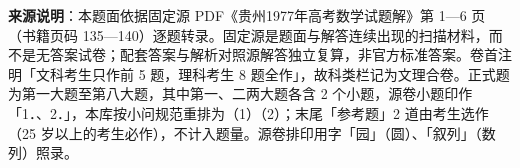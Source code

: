 


\begin{gktip}
\textbf{来源说明}：本题面依据固定源 PDF《贵州1977年高考数学试题解》第 1—6 页（书籍页码 135—140）逐题转录。固定源是题面与解答连续出现的扫描材料，而不是无答案试卷；配套答案与解析对照源解答独立复算，非官方标准答案。卷首注明「文科考生只作前 5 题，理科考生 8 题全作」，故科类栏记为文理合卷。正式题为第一大题至第八大题，其中第一、二两大题各含 2 个小题，源卷小题印作「1．、2．」，本库按小问规范重排为（1）（2）；末尾「参考题」2 道由考生选作（25 岁以上的考生必作），不计入题量。源卷排印用字「园」（圆）、「叙列」（数列）照录。
\end{gktip}

\par\medskip

